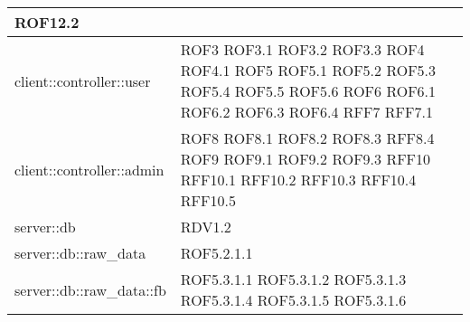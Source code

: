\begin{center}
\begin{longtable}{| p{9cm} | p{4cm} |}
\newline ROF12.2 \\
\hline
client::controller::user  &  ROF3 \newline ROF3.1 \newline ROF3.2 \newline ROF3.3 \newline ROF4
\newline ROF4.1 \newline ROF5 \newline ROF5.1 \newline ROF5.2 \newline ROF5.3 \newline ROF5.4
\newline ROF5.5  \newline ROF5.6 \newline ROF6 \newline ROF6.1 \newline ROF6.2 \newline ROF6.3 \newline ROF6.4 \newline RFF7 \newline RFF7.1 \\
\hline
client::controller::admin  &  ROF8 \newline ROF8.1 \newline ROF8.2 \newline ROF8.3 \newline RFF8.4
\newline ROF9 \newline ROF9.1 \newline ROF9.2 \newline ROF9.3 \newline RFF10 \newline RFF10.1
\newline RFF10.2 \newline RFF10.3 \newline RFF10.4 \newline RFF10.5 \\
\hline
server::db  & RDV1.2 \\
\hline
server::db::raw\_data  &  ROF5.2.1.1 \\
\hline
server::db::raw\_data::fb  & ROF5.3.1.1 \newline ROF5.3.1.2 \newline ROF5.3.1.3 \newline ROF5.3.1.4 \newline ROF5.3.1.5 \newline ROF5.3.1.6  \\

\end{longtable}
\end{center}
